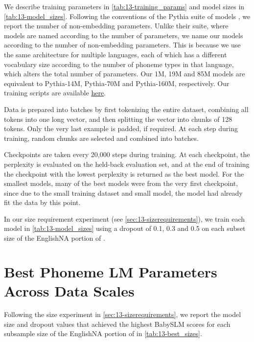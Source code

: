 We describe training parameters in \cref{tab:13-training_params} and model sizes in \cref{tab:13-model_sizes}. Following the conventions of the Pythia suite of models \citep{biderman2023pythia}, we report the number of non-embedding parameters. Unlike their suite, where models are named according to the number of parameters, we name our models according to the number of non-embedding parameters. This is because we use the same architecture for multiple languages, each of which has a different vocabulary size according to the number of phoneme types in that language, which alters the total number of parameters. Our 1M, 19M and 85M models are equivalent to Pythia-14M, Pythia-70M and Pythia-160M, respectively. Our training scripts are available \href{https://github.com/codebyzeb/PhonemeTransformers}{here}.

Data is prepared into batches by first tokenizing the entire dataset, combining all tokens into one long vector, and then splitting the vector into chunks of 128 tokens. Only the very last example is padded, if required. At each step during training, random chunks are selected and combined into batches. 

Checkpoints are taken every 20,000 steps during training. At each checkpoint, the perplexity is evaluated on the held-back evaluation set, and at the end of training the checkpoint with the lowest perplexity is returned as the best model. For the smallest models, many of the best models were from the very first checkpoint, since due to the small training dataset and small model, the model had already fit the data by this point.

In our size requirement experiment (see \cref{sec:13-sizerequirements}), we train each model in \cref{tab:13-model_sizes} using a dropout of 0.1, 0.3 and 0.5 on each subset size of the EnglishNA portion of \ipachildes.

\section{Best Phoneme LM Parameters Across Data Scales}\label{sec:13-best-model-parameters}


Following the size experiment in \cref{sec:13-sizerequirements}, we report the model size and dropout values that achieved the highest BabySLM scores for each subsample size of the EnglishNA portion of \ipachildes in \cref{tab:13-best_sizes}. 



